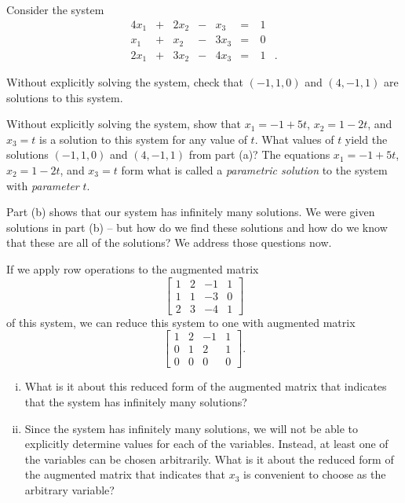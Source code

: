 \begin{activity} \label{act:A1.2_3} Consider the system  
\begin{alignat*}{4}
{}x_1	&{}+{} 	&{2}x_2		&{}-{}	&{}x_3 	&{}= & \ 1&{} \\
{}x_1	&{}+{}	&{}x_2 		&{}-{}	&{3}x_3	&{}= & \ 0&{}    \\
{2}x_1	&{}+{}	&{3}x_2		&{}-{}	&{4}x_3 &{}= & \ 1&{.}
\end{alignat*} 
	\ba
	\item Without explicitly solving the system, check that $(-1,1,0)$ and $(4,-1,1)$ are solutions to this system. 
	


	\item Without explicitly solving the system, show that $x_1 = -1+5t$, $x_2 = 1-2t$, and $x_3 = t$ is a solution to this system for any value of $t$. What values of $t$ yield the solutions $(-1,1,0)$ and $(4,-1,1)$ from part (a)? The equations $x_1 = -1+5t$, $x_2 = 1-2t$, and $x_3 = t$ form what is called a \emph{parametric solution} to the system with \emph{parameter} $t$. 
	


	\item Part (b) shows that our system has infinitely many solutions. We were given solutions in part (b) -- but how do we find these solutions and how do we know that these are all of the solutions? We address those questions now. 
 
If we apply row operations to the augmented matrix
\[\left[ \begin{array}{ccr|c} 1&2&-1&1 \\ 1&1&-3&0 \\ 2&3&-4&1 \end{array} \right] \]
of this system, we can reduce this system to one with augmented matrix
\[\left[ \begin{array}{ccr|c} 1&2&-1&1 \\ 0&1&2&1 \\ 0&0&0&0 \end{array} \right]. \]
		\begin{enumerate}[i.]
		\item What is it about this reduced form of the augmented matrix that indicates that the system has infinitely many solutions? 
	


		\item Since the system has infinitely many solutions, we will not be able to explicitly determine values for each of the variables. Instead, at least one of the variables can be chosen arbitrarily. What is it about the reduced form of the augmented matrix that indicates that $x_3$ is convenient to choose as the arbitrary variable?




\end{enumerate}
\end{activity}
